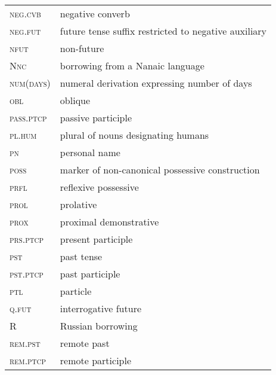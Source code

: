\documentclass[output=paper]{langscibook}
\begin{document}
\begin{tabularx}{.45\textwidth}{lQ}
\textsc{neg.cvb} & negative converb\\
\textsc{neg.fut} & future tense suffix restricted to negative auxiliary\\
\textsc{nfut} & non-future\\
\textsc{Nnc} & borrowing from a Nanaic language \\
\textsc{num(days)} & numeral derivation expressing number of days\\
\textsc{obl} & oblique\\
\textsc{pass.ptcp} & passive participle\\
\textsc{pl.hum} & plural of nouns designating humans\\
\textsc{pn} & personal name\\
\textsc{poss} & marker of non-canonical possessive construction\\
\textsc{prfl} & reflexive possessive\\
\textsc{prol} & prolative\\
\textsc{prox} & proximal demonstrative\\
\textsc{prs.ptcp} & present participle\\
\textsc{pst} & past tense\\
\textsc{pst.ptcp} & past participle\\
\textsc{ptl} & particle\\
\textsc{q.fut} & interrogative future\\
R & Russian borrowing\\
\textsc{rem.pst} & remote past\\
\textsc{rem.ptcp} & remote participle\\
\end{tabularx}
\end{document}
